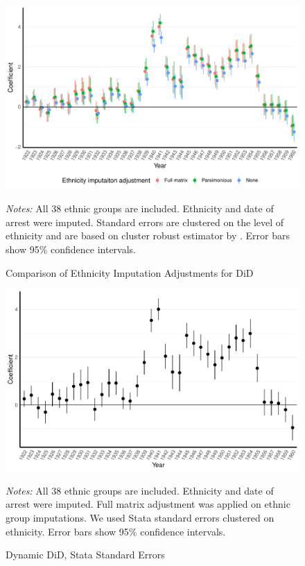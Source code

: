  \begin{figure}[H]
\centering
\caption{Comparison of  Ethnicity Imputation Adjustments for DiD}
\includegraphics[width=\textwidth]{plots/effects/robustness_checks/pred_adj_comp_pred_full_imp_date_cr2.pdf}
\begin{minipage}{0.92\textwidth}
\footnotesize
\emph{Notes:} All 38 ethnic groups are included. Ethnicity and date of arrest were imputed. Standard errors are clustered on the level of ethnicity and are based on cluster robust estimator by \citet{pustejovsky_small-sample_2018}. Error bars show 95\% confidence intervals. 
\end{minipage}
\label{fig:did_robustness_pred_adj}
\end{figure}

 \begin{figure}[H]
\centering
\caption{Dynamic DiD, Stata Standard Errors}
\includegraphics[width=\textwidth]{plots/final/fmla_pred_full_imp_date_no_trends_geopol_stata_SE.pdf}
\begin{minipage}{0.92\textwidth}
\footnotesize
\emph{Notes:} All 38 ethnic groups are included. Ethnicity and date of arrest were imputed.  Full matrix adjustment was applied on ethnic group imputations.  We used Stata standard errors clustered on ethnicity.  Error bars show 95\% confidence intervals. 
\end{minipage}
\label{fig:did_robustness_stata_se}
\end{figure}

